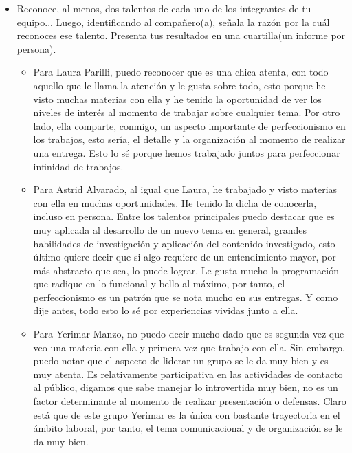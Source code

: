 \documentclass[a4paper,12pt]{article}
\begin{document}
\begin{itemize}
\item Reconoce, al menos, dos talentos de cada uno de los integrantes de tu equipo... Luego, identificando al compañero(a), señala la razón por la cuál reconoces ese talento. Presenta tus resultados en una cuartilla(un informe por persona).

\begin{itemize}
\item Para Laura Parilli, puedo reconocer que es una chica atenta, con todo aquello que le llama la atención y le gusta sobre todo, esto porque he visto muchas materias con ella y he tenido la oportunidad de ver los niveles de interés al momento de trabajar sobre cualquier tema. Por otro lado, ella comparte, conmigo, un aspecto importante de perfeccionismo en los trabajos, esto sería, el detalle y la organización al momento de realizar una entrega. Esto lo sé porque hemos trabajado juntos para perfeccionar infinidad de trabajos.

\item Para Astrid Alvarado, al igual que Laura, he trabajado y visto materias con ella en muchas oportunidades. He tenido la dicha de conocerla, incluso en persona. Entre los talentos principales puedo destacar que es muy aplicada al desarrollo de un nuevo tema en general, grandes habilidades de investigación y aplicación del contenido investigado, esto último quiere decir que si algo requiere de un entendimiento mayor, por más abstracto que sea, lo puede lograr. Le gusta mucho la programación que radique en lo funcional y bello al máximo, por tanto, el perfeccionismo es un patrón que se nota mucho en sus entregas. Y como dije antes, todo esto lo sé por experiencias vividas junto a ella.

\item Para Yerimar Manzo, no puedo decir mucho dado que es segunda vez que veo una materia con ella y primera vez que trabajo con ella. Sin embargo, puedo notar que el aspecto de liderar un grupo se le da muy bien y es muy atenta. Es relativamente participativa en las actividades de contacto al público, digamos que sabe manejar lo introvertida muy bien, no es un factor determinante al momento de realizar presentación o defensas. Claro está que de este grupo Yerimar es la única con bastante trayectoria en el ámbito laboral, por tanto, el tema comunicacional y de organización se le da muy bien.

\end{itemize}

\end{itemize}
\end{document}
